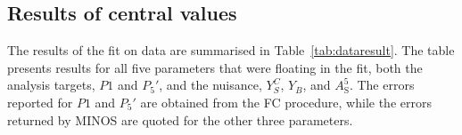 \subsection{Results of central values}
\label{sec:res-centval}

The results of the fit on data are summarised in Table~\ref{tab:dataresult}.
The table presents results for all five parameters that were floating in the fit, both the analysis targets, $P1$ and $P_5'$, and the nuisance, $Y^{C}_{S}$, $Y_{B}$, and $A^5_\mathrm{S}$.
The errors reported for $P1$ and $P_5'$ are obtained from the FC procedure, while the errors returned by MINOS are quoted for the other three parameters.


